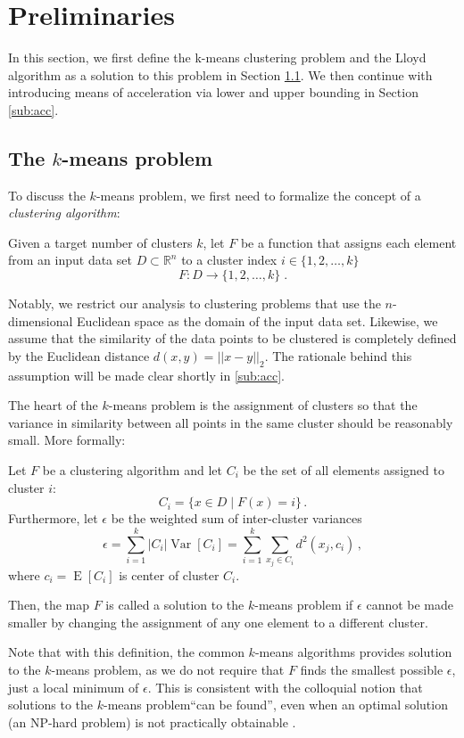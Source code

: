 \newcommand{\kmeans}{$k$-means problem\xspace}

\section{Preliminaries}\label{Preliminaries}

In this section, we first define the k-means clustering problem and the Lloyd algorithm as a solution to this problem in Section \ref{subsec: kmeans}. We then continue with introducing means of acceleration via lower and upper bounding in Section \ref{sub:acc}.


\subsection{The \kmeans} \label{subsec: kmeans}

To discuss the \kmeans, we first need to formalize the concept of a \emph{clustering algorithm}:
\begin{definition}
	Given a target number of clusters $k$,
	let $F$ be a function that assigns each element from an input data set $D\subset \mathbb{R}^n$ to a
	cluster index $i \in \{1, 2, \ldots, k\}$
	$$ F:D \to \{1, 2, \ldots, k\} \;.$$
\end{definition}
Notably, we restrict our analysis to clustering problems that use the $n$-dimensional Euclidean space as the domain of the input data set.
Likewise, we assume that the similarity of the data points to be clustered is completely defined by the Euclidean distance $d(x,y)= || x-y ||_2 $.
The rationale behind this assumption will be made clear shortly in \autoref{sub:acc}.

The heart of the \kmeans is the assignment of clusters so that the variance in similarity between all points in the same cluster should be reasonably small.
More formally:
\begin{definition}[\kmeans]
	Let $F$ be a clustering algorithm
	and let $C_i$ be the set of all elements assigned to cluster $i$:
	$$ C_i = \{x \in D \mid F(x) = i\} \,.$$
	Furthermore, let $\epsilon$ be the weighted sum of inter-cluster variances
	$$ \epsilon = \sum_{i=1}^k |C_i| \operatorname{Var}[C_i] = \sum_{i=1}^k \sum_{x_j \in C_i}  d^2(x_j, c_i)\,, $$
	where $c_i = \operatorname{E}[C_i]$ is center of cluster $C_i$.

	Then, the map $F$ is called a solution to the \kmeans
	if $\epsilon$ cannot be made smaller by changing the assignment of any one element to a different cluster.
\end{definition}
Note that with this definition, the common $k$-means algorithms provides solution to the \kmeans,
as we do not require that $F$ finds the smallest possible $\epsilon$,
just a local minimum of $\epsilon$.
This is consistent with the colloquial notion that solutions to the \kmeans ``can be found'',
even when an optimal solution (an NP-hard problem) is not practically obtainable \cite{}.

